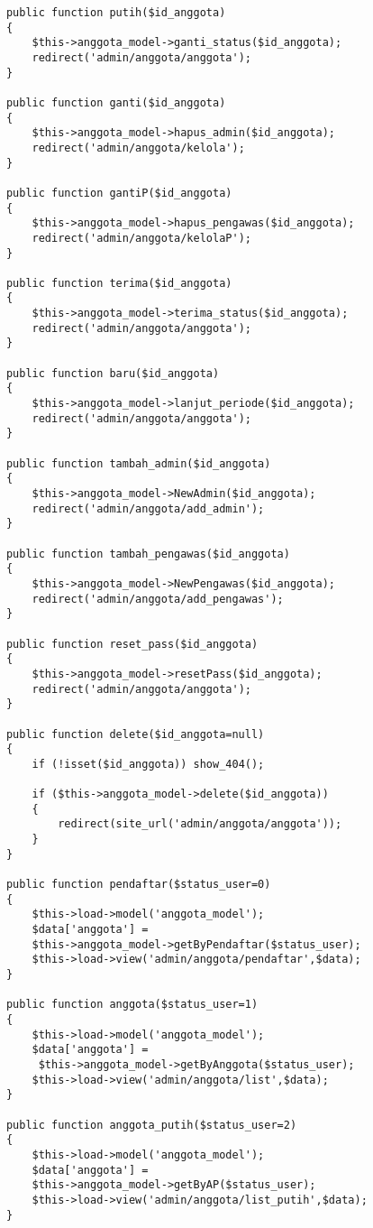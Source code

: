 \begin{verbatim}
			public function putih($id_anggota)
			{
				$this->anggota_model->ganti_status($id_anggota);
				redirect('admin/anggota/anggota');
			}
			
			public function ganti($id_anggota)
			{
				$this->anggota_model->hapus_admin($id_anggota);
				redirect('admin/anggota/kelola');
			}
			
			public function gantiP($id_anggota)
			{
				$this->anggota_model->hapus_pengawas($id_anggota);
				redirect('admin/anggota/kelolaP');
			}
			
			public function terima($id_anggota)
			{
				$this->anggota_model->terima_status($id_anggota);
				redirect('admin/anggota/anggota');
			}
			
			public function baru($id_anggota)
			{
				$this->anggota_model->lanjut_periode($id_anggota);
				redirect('admin/anggota/anggota');
			}
			
			public function tambah_admin($id_anggota)
			{
				$this->anggota_model->NewAdmin($id_anggota);
				redirect('admin/anggota/add_admin');
			}
			
			public function tambah_pengawas($id_anggota)
			{
				$this->anggota_model->NewPengawas($id_anggota);
				redirect('admin/anggota/add_pengawas');
			}
			
			public function reset_pass($id_anggota)
			{
				$this->anggota_model->resetPass($id_anggota);
				redirect('admin/anggota/anggota');
			}
			
			public function delete($id_anggota=null)
			{
				if (!isset($id_anggota)) show_404();
				
				if ($this->anggota_model->delete($id_anggota)) 
				{
					redirect(site_url('admin/anggota/anggota'));
				}
			}
			
			public function pendaftar($status_user=0)
			{
				$this->load->model('anggota_model');
				$data['anggota'] = 
				$this->anggota_model->getByPendaftar($status_user);
				$this->load->view('admin/anggota/pendaftar',$data);
			}
			
			public function anggota($status_user=1)
			{
				$this->load->model('anggota_model');
				$data['anggota'] =
				 $this->anggota_model->getByAnggota($status_user);
				$this->load->view('admin/anggota/list',$data);
			}
			
			public function anggota_putih($status_user=2)
			{
				$this->load->model('anggota_model');
				$data['anggota'] = 
				$this->anggota_model->getByAP($status_user);
				$this->load->view('admin/anggota/list_putih',$data);
			}
			

\end{verbatim}
